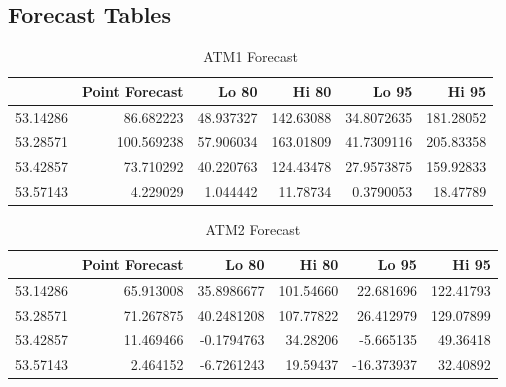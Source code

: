 \documentclass[openany]{book}
\begin{document}
\hypertarget{Part-A-FC}{%
\subsection*{Forecast Tables}\label{Part-A-FC}}

\begin{table}[H]

\caption{\label{tab:unnamed-chunk-11}ATM1 Forecast}
\centering
\begin{tabular}{l|r|r|r|r|r}
\hline
\textbf{ } & \textbf{Point Forecast} & \textbf{Lo 80} & \textbf{Hi 80} & \textbf{Lo 95} & \textbf{Hi 95}\\
\hline
\rowcolor{gray!6}  53.14286 & 86.682223 & 48.937327 & 142.63088 & 34.8072635 & 181.28052\\
\hline
53.28571 & 100.569238 & 57.906034 & 163.01809 & 41.7309116 & 205.83358\\
\hline
\rowcolor{gray!6}  53.42857 & 73.710292 & 40.220763 & 124.43478 & 27.9573875 & 159.92833\\
\hline
53.57143 & 4.229029 & 1.044442 & 11.78734 & 0.3790053 & 18.47789\\
\hline
\end{tabular}
\end{table}

\begin{table}[H]

\caption{\label{tab:unnamed-chunk-11}ATM2 Forecast}
\centering
\begin{tabular}{l|r|r|r|r|r}
\hline
\textbf{ } & \textbf{Point Forecast} & \textbf{Lo 80} & \textbf{Hi 80} & \textbf{Lo 95} & \textbf{Hi 95}\\
\hline
\rowcolor{gray!6}  53.14286 & 65.913008 & 35.8986677 & 101.54660 & 22.681696 & 122.41793\\
\hline
53.28571 & 71.267875 & 40.2481208 & 107.77822 & 26.412979 & 129.07899\\
\hline
\rowcolor{gray!6}  53.42857 & 11.469466 & -0.1794763 & 34.28206 & -5.665135 & 49.36418\\
\hline
53.57143 & 2.464152 & -6.7261243 & 19.59437 & -16.373937 & 32.40892\\
\hline
\end{tabular}
\end{table}
\end{document}
